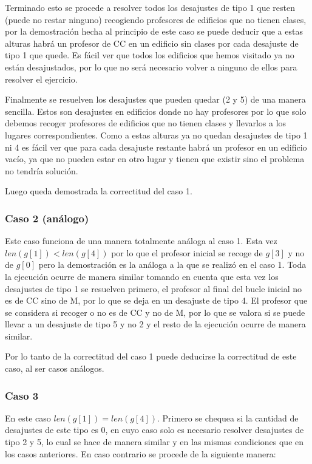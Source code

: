 \documentclass[11pt]{article}
\begin{document}
    Terminado esto se procede a resolver todos los desajustes de tipo 1 que resten (puede no restar ninguno) recogiendo profesores de edificios
    que no tienen clases, por la demostración hecha al principio de este caso se puede deducir que a estas alturas habrá un profesor de CC en un
    edificio sin clases por cada desajuste de tipo 1 que quede. Es fácil ver que todos los edificios que hemos visitado ya no están desajustados,
    por lo que no será necesario volver a ninguno de ellos para resolver el ejercicio.

    Finalmente se resuelven los desajustes que pueden quedar (2 y 5) de una manera sencilla. Estos son desajustes en
    edificios donde no hay profesores por lo que solo debemos recoger profesores de edificios que no tienen clases y
    llevarlos a los lugares correspondientes. Como a estas alturas ya no quedan desajustes de tipo 1 ni 4 es fácil ver
    que para cada desajuste restante habrá un profesor en un edificio vacío, ya que no pueden estar en otro lugar y tienen
    que existir sino el problema no tendría solución.

    Luego queda demostrada la correctitud del caso 1.

    \subsubsection{Caso 2 (análogo)}
    Este caso funciona de una manera totalmente análoga al caso 1. Esta vez $len(g[1]) < len(g[4])$ por lo que el profesor
    inicial se recoge de $g[3]$ y no de $g[0]$ pero la demostración es la análoga a la que se realizó en el caso 1.
    Toda la ejecución ocurre de manera similar tomando en cuenta que esta vez los desajustes de tipo 1 se resuelven primero,
    el profesor al final del bucle inicial no es de CC sino de M, por lo que se deja en un desajuste de tipo 4.
    El profesor que se considera si recoger o no es de CC y no de M, por lo que se valora si se puede llevar a un desajuste
    de tipo 5 y no 2 y el resto de la ejecución ocurre de manera similar.

    Por lo tanto de la correctitud del caso 1 puede deducirse la correctitud de este caso, al ser casos análogos.

    \subsubsection{Caso 3}
    En este caso $len(g[1]) = len(g[4])$. Primero se chequea si la cantidad de desajustes de este tipo es 0, en cuyo caso solo
    es necesario resolver desajustes de tipo 2 y 5, lo cual se hace de manera similar y en las mismas condiciones que en los
    casos anteriores. En caso contrario se procede de la siguiente manera:
\end{document}
